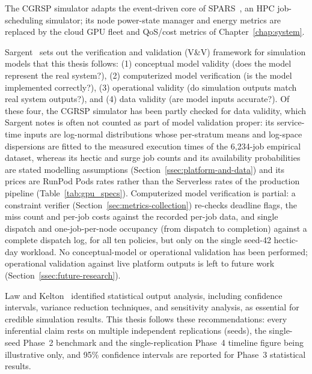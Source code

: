 The CGRSP simulator adapts the event-driven core of SPARS~\cite{amrizal2026spars}, an HPC job-scheduling simulator; its node power-state manager and energy metrics are replaced by the cloud GPU fleet and QoS/cost metrics of Chapter~\ref{chap:system}.

Sargent~\cite{sargent2013verification} sets out the verification and validation (V\&V) framework for simulation models that this thesis follows: (1) conceptual model validity (does the model represent the real system?), (2) computerized model verification (is the model implemented correctly?), (3) operational validity (do simulation outputs match real system outputs?), and (4) data validity (are model inputs accurate?). Of these four, the CGRSP simulator has been partly checked for data validity, which Sargent notes is often not counted as part of model validation proper: its service-time inputs are log-normal distributions whose per-stratum means and log-space dispersions are fitted to the measured execution times of the 6,234-job empirical dataset, whereas its hectic and surge job counts and its availability probabilities are stated modelling assumptions (Section~\ref{ssec:platform-and-data}) and its prices are RunPod Pods rates rather than the Serverless rates of the production pipeline (Table~\ref{tab:gpu_specs}). Computerized model verification is partial: a constraint verifier (Section~\ref{sec:metrics-collection}) re-checks deadline flags, the miss count and per-job costs against the recorded per-job data, and single dispatch and one-job-per-node occupancy (from dispatch to completion) against a complete dispatch log, for all ten policies, but only on the single seed-42 hectic-day workload. No conceptual-model or operational validation has been performed; operational validation against live platform outputs is left to future work (Section~\ref{ssec:future-research}).

Law and Kelton~\cite{law2000simulation} identified statistical output analysis, including confidence intervals, variance reduction techniques, and sensitivity analysis, as essential for credible simulation results. This thesis follows these recommendations: every inferential claim rests on multiple independent replications (seeds), the single-seed Phase~2 benchmark and the single-replication Phase~4 timeline figure being illustrative only, and 95\% confidence intervals are reported for Phase~3 statistical results.

